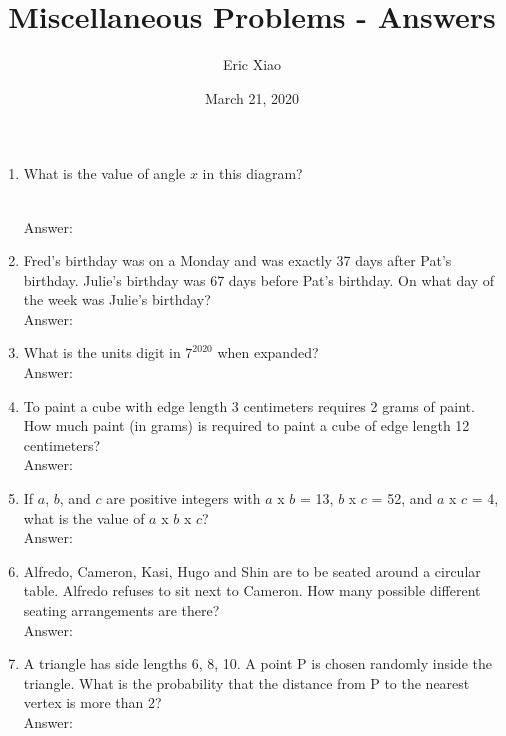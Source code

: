\documentclass[12pt]{article}
\title{Miscellaneous Problems - Answers}
\author{Eric Xiao}
\date{March 21, 2020}
\begin{document}
\maketitle

\begin{enumerate}
    \itemsep3.0em
    \item {What is the value of angle {$x$\textdegree} in this diagram?
    
    }{\\Answer: \fbox{46\textdegree}}
    
    \item {Fred's birthday was on a Monday and was exactly 37 days after Pat's birthday. Julie's birthday was 67 days before Pat's birthday. On what day of the week was Julie's birthday?}{\\Answer: }
    
    \item {What is the units digit in $7^{2020}$ when expanded?}{\\Answer: }
    
    \item {To paint a cube with edge length 3 centimeters requires 2 grams of paint. How much paint (in grams) is required to paint a cube of edge length 12 centimeters?}{\\Answer: }

    \item {If $a$, $b$, and $c$ are positive integers with $a$ x $b$ = 13, $b$ x $c$ = 52, and $a$ x $c$ = 4, what is the value of $a$ x $b$ x $c$?}{\\Answer: }
    
    \item {Alfredo, Cameron, Kasi, Hugo and Shin are to be seated around a circular table. Alfredo refuses to sit next to Cameron. How many possible different seating arrangements are there?}{\\Answer: }
    
    \item {A triangle has side lengths 6, 8, 10. A point P is chosen randomly inside the triangle. What is the probability that the distance from P to the nearest vertex is more than 2?}{\\Answer: }
    

\end{enumerate}
\end{document}
